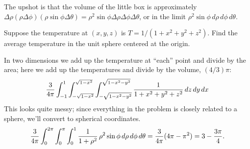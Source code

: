 The upshot is that the volume of the little box is approximately
$\Delta\rho(\rho\Delta\phi)(\rho\sin\phi\Delta\theta)
=\rho^2\sin\phi\Delta\rho\Delta\phi\Delta\theta$, or in the limit
$\rho^2\sin\phi\,d\rho\,d\phi\,d\theta$.

\begin{example} Suppose the temperature at $(x,y,z)$ is
$T=1/(1+x^2+y^2+z^2)$. Find the average temperature in the unit sphere
centered at the origin.

In two dimensions we add up the temperature at ``each'' point and
divide by the area; here we add up the temperatures and divide by the
volume, $(4/3)\pi$:
$${3\over4\pi}\int_{-1}^1\int_{-\sqrt{1-x^2}}^{\sqrt{1-x^2}}
\int_{-\sqrt{1-x^2-y^2}}^{\sqrt{1-x^2-y^2}}
{1\over1+x^2+y^2+z^2}\,dz\,dy\,dx
$$
This looks quite messy; since everything in the problem is closely
related to a sphere, we'll convert to spherical coordinates.
$${3\over4\pi}\int_0^{2\pi}\int_0^\pi
\int_0^1
{1\over1+\rho^2}\,\rho^2\sin\phi\,d\rho\,d\phi\,d\theta
={3\over4\pi}(4\pi -\pi^2)=3-{3\pi\over4}.
$$
\end{example}

